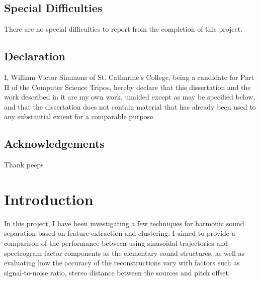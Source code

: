 \documentclass[12pt,a4paper,twoside,openright]{report}
\begin{document}

\section*{Special Difficulties}

There are no special difficulties to report from the completion of this project.

\newpage

\section*{Declaration}

I, William Victor Simmons of St. Catharine's College, being a candidate for Part II of the Computer Science Tripos, hereby declare that this dissertation and the work described in it are my own work, unaided except as may be specified below, and that the dissertation does not contain material that has already been used to any substantial extent for a comparable purpose.

\bigskip
{} %
\medskip
{}

\tableofcontents

\listoffigures

\newpage

\section*{Acknowledgements}

Thank peeps

\chapter{Introduction}

\pagestyle{headings}


In this project, I have been investigating a few techniques for harmonic sound separation based on feature extraction and clustering. I aimed to provide a comparison of the performance between using sinusoidal trajectories and spectrogram factor components as the elementary sound structures, as well as evaluating how the accuracy of the reconstructions vary with factors such as signal-to-noise ratio, stereo distance between the sources and pitch offset.
\end{document}
